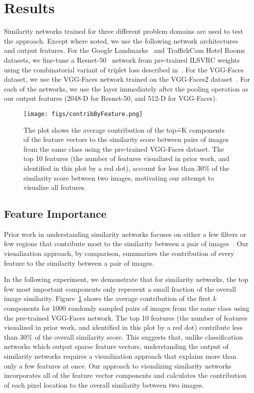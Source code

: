 \section{Results}
Similarity networks trained for three different problem domains are used to test the approach. Except where noted, we use the following network architectures and output features. For the Google Landmarks~\cite{googleLandmarks} and TraffickCam Hotel Rooms~\cite{aipr2015} datasets, we fine-tune a Resnet-50~\cite{resnet} network from pre-trained ILSVRC weights~\cite{ILSVRC15} using the combinatorial variant of triplet loss described in~\cite{HermansBeyer2017Arxiv}. For the VGG-Faces dataset, we use the VGG-Faces network trained on the VGG-Faces2 dataset~\cite{vggfaces,vggface2}. For each of the networks, we use the layer immediately after the pooling operation as our output features (2048-D for Resnet-50, and 512-D for VGG-Faces).

\begin{figure}
    \centering
    \texttt{[image: figs/contribByFeature.png]}
    \caption{The plot shows the average contribution of the top\==K components of the feature vectors to the similarity score between pairs of images from the same class using the pre-trained VGG-Faces dataset. The top 10 features (the number of features visualized in prior work, and identified in this plot by a red dot), account for less than 30\% of the similarity score between two images, motivating our attempt to visualize all features.}
    \label{fig:contribByFeature}
\end{figure}

\subsection{Feature Importance}
\label{sec:FeatureImportance}
Prior work in understanding similarity networks focuses on either a few filters or few regions that contribute most to the similarity between a pair of images~\cite{Ahmed_2015_CVPR,RTC16,tolias2016rmac}. Our visualization approach, by comparison, summarizes the contribution of every feature to the similarity between a pair of images. 

In the following experiment, we demonstrate that for similarity networks, the top few most important components only represent a small fraction of the overall image similarity.  Figure~\ref{fig:contribByFeature} shows the average contribution of the first $k$ components for 1000 randomly sampled pairs of images from the same class using the pre-trained VGG-Faces network. The top 10 features (the number of features visualized in prior work, and identified in this plot by a red dot) contribute less than 30\% of the overall similarity score. This suggests that, unlike classification networks which output sparse feature vectors, understanding the output of similarity networks requires a visualization approach that explains more than only a few features at once. Our approach to visualizing similarity networks incorporates all of the feature vector components and calculates the contribution of each pixel location to the overall similarity between two images.

